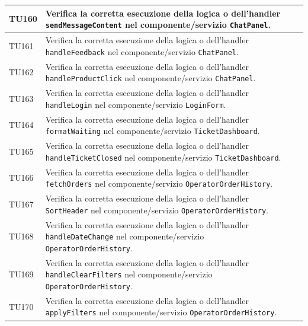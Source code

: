 \documentclass[a4paper,11pt,oneside]{scrartcl}
\begin{document}
\begin{longtable}{|p{1.9cm}|p{11.6cm}|c|}
    TU160           & Verifica la corretta esecuzione della logica o dell'handler \texttt{sendMessageContent} nel componente/servizio \texttt{ChatPanel}.                          &                \\ \hline
    TU161           & Verifica la corretta esecuzione della logica o dell'handler \texttt{handleFeedback} nel componente/servizio \texttt{ChatPanel}.                              &                \\ \hline
    TU162           & Verifica la corretta esecuzione della logica o dell'handler \texttt{handleProductClick} nel componente/servizio \texttt{ChatPanel}.                          &                \\ \hline
    TU163           & Verifica la corretta esecuzione della logica o dell'handler \texttt{handleLogin} nel componente/servizio \texttt{LoginForm}.                                 &                \\ \hline
    TU164           & Verifica la corretta esecuzione della logica o dell'handler \texttt{formatWaiting} nel componente/servizio \texttt{TicketDashboard}.                         &                \\ \hline
    TU165           & Verifica la corretta esecuzione della logica o dell'handler \texttt{handleTicketClosed} nel componente/servizio \texttt{TicketDashboard}.                    &                \\ \hline
    TU166           & Verifica la corretta esecuzione della logica o dell'handler \texttt{fetchOrders} nel componente/servizio \texttt{OperatorOrderHistory}.                      &                \\ \hline
    TU167           & Verifica la corretta esecuzione della logica o dell'handler \texttt{SortHeader} nel componente/servizio \texttt{OperatorOrderHistory}.                       &                \\ \hline
    TU168           & Verifica la corretta esecuzione della logica o dell'handler \texttt{handleDateChange} nel componente/servizio \texttt{OperatorOrderHistory}.                 &                \\ \hline
    TU169           & Verifica la corretta esecuzione della logica o dell'handler \texttt{handleClearFilters} nel componente/servizio \texttt{OperatorOrderHistory}.               &                \\ \hline
    TU170           & Verifica la corretta esecuzione della logica o dell'handler \texttt{applyFilters} nel componente/servizio \texttt{OperatorOrderHistory}.                     &                \\ \hline

\end{longtable}
\end{document}
